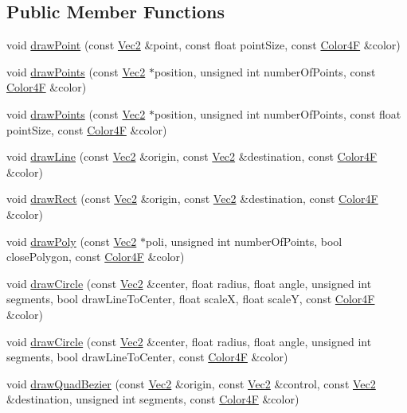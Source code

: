 \subsection*{Public Member Functions}
\begin{DoxyCompactItemize}
\item 
void \hyperlink{classDrawNode_ae95a0e497adf2884d571262e4725822e}{draw\+Point} (const \hyperlink{classVec2}{Vec2} \&point, const float point\+Size, const \hyperlink{structColor4F}{Color4F} \&color)
\item 
void \hyperlink{classDrawNode_a258b2a3fb7e094b1eebf17b0538e6dde}{draw\+Points} (const \hyperlink{classVec2}{Vec2} $\ast$position, unsigned int number\+Of\+Points, const \hyperlink{structColor4F}{Color4F} \&color)
\item 
void \hyperlink{classDrawNode_a0bd985652af62bea73a86155560ec313}{draw\+Points} (const \hyperlink{classVec2}{Vec2} $\ast$position, unsigned int number\+Of\+Points, const float point\+Size, const \hyperlink{structColor4F}{Color4F} \&color)
\item 
void \hyperlink{classDrawNode_a0e45a721e54084a78121171f3e752933}{draw\+Line} (const \hyperlink{classVec2}{Vec2} \&origin, const \hyperlink{classVec2}{Vec2} \&destination, const \hyperlink{structColor4F}{Color4F} \&color)
\item 
void \hyperlink{classDrawNode_ac4a2969bd4fb055c9212c37b0966e093}{draw\+Rect} (const \hyperlink{classVec2}{Vec2} \&origin, const \hyperlink{classVec2}{Vec2} \&destination, const \hyperlink{structColor4F}{Color4F} \&color)
\item 
void \hyperlink{classDrawNode_a099aa3372ad6fe9f135a166e1e071130}{draw\+Poly} (const \hyperlink{classVec2}{Vec2} $\ast$poli, unsigned int number\+Of\+Points, bool close\+Polygon, const \hyperlink{structColor4F}{Color4F} \&color)
\item 
void \hyperlink{classDrawNode_adf9a11257ee5e1e308792a8949e3093b}{draw\+Circle} (const \hyperlink{classVec2}{Vec2} \&center, float radius, float angle, unsigned int segments, bool draw\+Line\+To\+Center, float scaleX, float scaleY, const \hyperlink{structColor4F}{Color4F} \&color)
\item 
void \hyperlink{classDrawNode_af5a7e9947c1048ab5b718c1b5bbca12f}{draw\+Circle} (const \hyperlink{classVec2}{Vec2} \&center, float radius, float angle, unsigned int segments, bool draw\+Line\+To\+Center, const \hyperlink{structColor4F}{Color4F} \&color)
\item 
void \hyperlink{classDrawNode_a16f0f5a0e7825e469c33df8694b51dc6}{draw\+Quad\+Bezier} (const \hyperlink{classVec2}{Vec2} \&origin, const \hyperlink{classVec2}{Vec2} \&control, const \hyperlink{classVec2}{Vec2} \&destination, unsigned int segments, const \hyperlink{structColor4F}{Color4F} \&color)

\end{DoxyCompactItemize}

